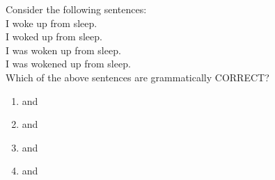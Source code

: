 \item Consider the following sentences:\\
 \; I woke up from sleep.\\
 \; I woked up from sleep.\\
 \;I was woken up from sleep.\\
 \;I was wokened up from sleep.\\
Which of the above sentences are grammatically CORRECT?
\begin{enumerate}
    \item {} and 
    \item {} and 
    \item {} and 
    \item {} and 
\end{enumerate}
